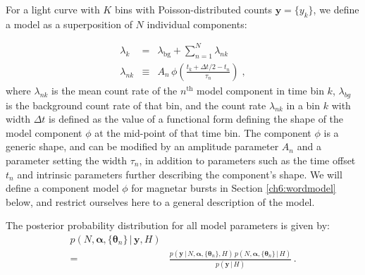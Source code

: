 \documentclass[12pt]{emulateapj}
\newcommand{\given}{\,|\,}
\newcommand{\counts}{y}
\newcommand{\pars}{\theta}
\newcommand{\mean}{\lambda}
\newcommand{\Poisson}{{\mathcal P}}
\newcommand{\bg}{\mathrm{bg}}
\newcommand{\word}{\phi}
\begin{document}
For a light curve with $K$ bins with Poisson-distributed counts $\bm{\counts} = \{\counts_k\}$, we define a model as a superposition of $N$ individual components:

\begin{eqnarray}
\mean_k &=& \mean_{\bg} + \sum_{n=1}^N \mean_{nk}
\\
\mean_{nk} &\equiv& A_n\,\word\left(\frac{t_k+\Delta t/2-t_n}{\tau_n}\right) \; ,
\end{eqnarray}
where $\mean_{nk}$ is the mean count rate of the $n^{\mathrm{th}}$ model component in time bin $k$, 
$\mean_{bg}$ is the background count rate of that bin,
and the count rate $\mean_{nk}$ in a bin $k$ with width $\Delta t$ is defined as the value of a functional form defining the shape of
the model component $\word$ at the mid-point of that time bin. The component $\word$ is a generic shape,
and can be modified by an amplitude parameter $A_n$ and a parameter setting the width $\tau_n$, in addition to
parameters such as the time offset $t_n$ and intrinsic parameters further describing the component's shape.
We will define a component model $\word$ for magnetar bursts in Section \ref{ch6:wordmodel} below, and
restrict ourselves here to a general description of the model.

The posterior probability distribution for all model parameters is given by:
\begin{eqnarray}
p(N, \bm{\alpha},\{\bm{\theta}_n \} \given \bm{\counts}, H) &   \\\nonumber
 						 = & \frac{p(\bm{\counts} \given N, \bm{\alpha}, \{\bm{\theta}_n \}, H)\, p(N, \bm{\alpha}, \{\bm{\theta}_n \} \given H)}{p(\bm{\counts} \given H)} \, .
\end{eqnarray}
\end{document}

